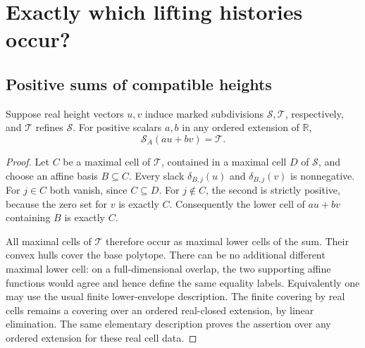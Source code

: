 \documentclass[11pt,a4paper]{article}
\numberwithin{equation}{section}
\theoremstyle{plain}
\newcommand{\R}{\mathbb R}
\newcommand{\cS}{\mathcal S}
\begin{document}
\section{Exactly which lifting histories occur?}\label{poly:ts:sec:histories}

\subsection{Positive sums of compatible heights}
\begin{lemma}\label{poly:ts:lem:compatible}
Suppose real height vectors $u,v$ induce marked subdivisions
$\mathcal S,\mathcal T$, respectively, and $\mathcal T$ refines
$\mathcal S$. For positive scalars $a,b$ in any ordered extension of
$\R$,
\[
 \cS_A(au+bv)=\mathcal T.
\]
\end{lemma}
\begin{proof}
Let $C$ be a maximal cell of $\mathcal T$, contained in a maximal cell
$D$ of $\mathcal S$, and choose an affine basis $B\subseteq C$. Every
slack $\delta_{B,j}(u)$ and $\delta_{B,j}(v)$ is nonnegative. For $j\in C$
both vanish, since $C\subseteq D$. For $j\notin C$, the second is
strictly positive, because the zero set for $v$ is exactly $C$.
Consequently the lower cell of $au+bv$ containing $B$ is exactly $C$.

All maximal cells of $\mathcal T$ therefore occur as maximal lower cells
of the sum. Their convex hulls cover the base polytope. There can be no
additional different maximal lower cell: on a full-dimensional overlap,
the two supporting affine functions would agree and hence define the
same equality labels. Equivalently one may use the usual finite
lower-envelope description. The finite covering by real cells remains a
covering over an ordered real-closed extension, by linear elimination.
The same elementary description proves the assertion over any ordered
extension for these real cell data.
\end{proof}
\end{document}
